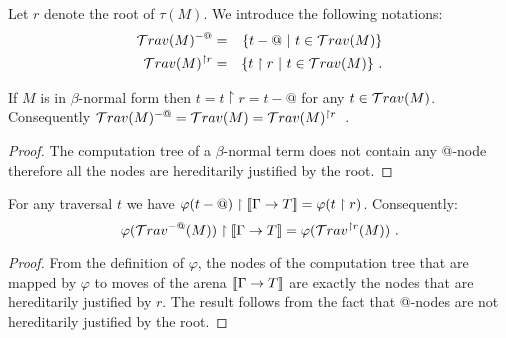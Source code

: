 Let $r$ denote the root of $\tau(M)$. We introduce the following notations:
\begin{eqnarray*}
\mathcal{T}rav(M)^{-@} &=& \{ t - @ \ | \  t \in \mathcal{T}rav(M) \} \\
\mathcal{T}rav(M)^{\upharpoonright r} &=& \{ t  \upharpoonright r \ | \  t  \in \mathcal{T}rav(M) \} \ .
\end{eqnarray*}

\begin{lem}
If $M$ is in $\beta$-normal form then $t = t \upharpoonright r = t - @$ for any $t \in \mathcal{T}rav(M)$.
Consequently $\mathcal{T}rav(M)^{-@} = \mathcal{T}rav(M) =  \mathcal{T}rav(M)^{\upharpoonright r }$\ .
\end{lem}
\begin{proof}
The computation tree of a  $\beta$-normal term does not contain any @-node therefore all the nodes are hereditarily justified by the root.
\end{proof}



\begin{lem}
\label{lem:varphi_filter}
For any traversal $t$ we have
$\varphi(t-@) \upharpoonright {[\![\Gamma \rightarrow T ]\!]} = \varphi(t\upharpoonright r)$.
Consequently:
$$ \varphi(\mathcal{T}rav^{-@}(M)) \upharpoonright {[\![\Gamma \rightarrow T ]\!]} = \varphi(\mathcal{T}rav^{\upharpoonright r}(M))\ .$$
\end{lem}
\begin{proof}
    From the definition of $\varphi$, the nodes of the computation tree that are mapped by $\varphi$
    to moves of the arena ${[\![ \Gamma \rightarrow T ]\!]}$ are exactly the nodes that are hereditarily justified by $r$.
    The result follows from the fact that @-nodes are not hereditarily justified by the root.
\end{proof}

